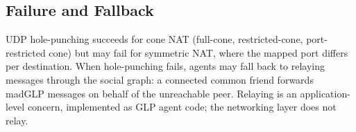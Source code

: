 \subsection{Failure and Fallback}
\label{sec:rv-fallback}
UDP hole-punching succeeds for cone NAT (full-cone, restricted-cone, port-restricted cone) but may fail for symmetric NAT, where the mapped port differs per destination.  When hole-punching fails, agents may fall back to relaying messages through the social graph: a connected common friend forwards madGLP messages on behalf of the unreachable peer.  Relaying is an application-level concern, implemented as GLP agent code; the networking layer does not relay.
